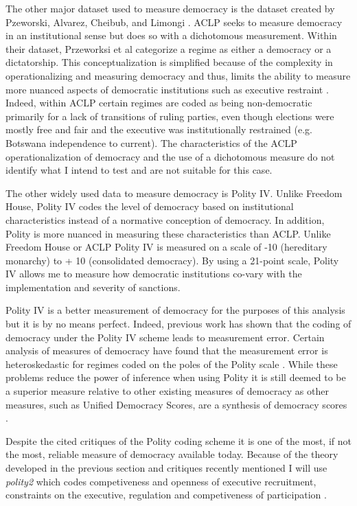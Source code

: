 \documentclass[a4paper]{article}\usepackage[]{graphicx}\usepackage[]{color}
\begin{document}
\par
The other major dataset used to measure democracy is the dataset created by Pzeworski, Alvarez, Cheibub, and Limongi \citet[Henceforth \textbf{ACLP}]{przeworski2000democracy}. ACLP seeks to measure democracy in an institutional sense but does so with a dichotomous measurement. Within their dataset, Przeworksi et al categorize a regime as either a democracy or a dictatorship. This conceptualization is simplified because of the complexity in operationalizing and measuring democracy and thus, limits the ability to measure more nuanced aspects of democratic institutions such as executive restraint \citep{bogaards2012draw}. Indeed, within ACLP certain regimes are coded as being non-democratic primarily for a lack of transitions of ruling parties, even though elections were mostly free and fair and the executive was institutionally restrained (e.g. Botswana independence to current). The characteristics of the ACLP operationalization of democracy and the use of a dichotomous measure do not identify what I intend to test and are not suitable for this case.  
\par
The other widely used data to measure democracy is Polity IV. Unlike Freedom House, Polity IV codes the level of democracy based on institutional characteristics instead of a normative conception of democracy. In addition, Polity is more nuanced in measuring these characteristics than ACLP. Unlike Freedom House or ACLP Polity IV is measured on a scale of -10 (hereditary monarchy) to + 10 (consolidated democracy). By using a 21-point scale, Polity IV allows me to measure how democratic institutions co-vary with the implementation and severity of sanctions.  
\par
Polity IV is a better measurement of democracy for the purposes of this analysis but it is by no means perfect. Indeed, previous work has shown that the coding of democracy under the Polity IV scheme leads to measurement error. Certain analysis of measures of democracy have found that the measurement error is heteroskedastic for regimes coded on the poles of the Polity scale \citep{treier2008democracy, pemstein2010democratic}. While these problems reduce the power of inference when using Polity it is still deemed to be a superior measure relative to other existing measures of democracy \citep{munck2002conceptualizing} as other measures, such as Unified Democracy Scores, are a synthesis of democracy scores \citep{pemstein2010democratic}.
\par
Despite the cited critiques of the Polity coding scheme it is one of the most, if not the most, reliable measure of democracy available today. Because of the theory developed in the previous section and critiques recently mentioned I will use \textit{polity2} which codes competiveness and openness of executive recruitment, constraints on the executive, regulation and competiveness of participation \citep{marshall2002polity}. 
\end{document}

